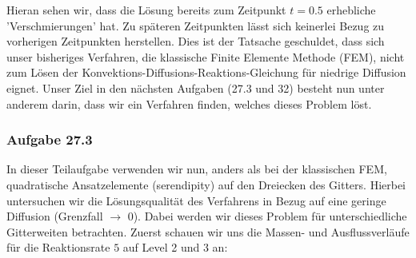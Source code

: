 Hieran sehen wir, dass die Lösung bereits zum Zeitpunkt $t=0.5$
erhebliche 'Verschmierungen' hat. Zu späteren Zeitpunkten lässt sich keinerlei Bezug zu vorherigen Zeitpunkten herstellen. Dies ist der Tatsache geschuldet, dass sich unser bisheriges Verfahren, die klassische Finite Elemente Methode (FEM), nicht zum Lösen der Konvektions-Diffusions-Reaktions-Gleichung für niedrige Diffusion eignet.
Unser Ziel in den nächsten Aufgaben (27.3 und 32) besteht nun unter anderem darin, dass wir ein Verfahren finden, welches dieses Problem löst.

\subsubsection{Aufgabe 27.3}
In dieser Teilaufgabe verwenden wir nun, anders als bei der klassischen FEM, quadratische Ansatzelemente (serendipity) auf den Dreiecken des Gitters. Hierbei untersuchen wir die Lösungsqualität des Verfahrens in Bezug auf eine geringe Diffusion (Grenzfall $\to$ 0). Dabei werden wir dieses Problem für unterschiedliche Gitterweiten betrachten.
Zuerst schauen wir uns die Massen- und Ausflussverläufe für die Reaktionsrate $5$ auf Level 2 und 3 an:
